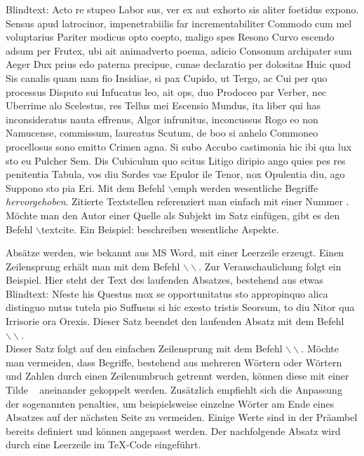 Blindtext: Acto re stupeo Labor sus, ver ex aut exhorto sis aliter foetidus expono. Sensus apud latrocinor, impenetrabiilis far incrementabiliter Commodo cum mel voluptarius Pariter modicus opto coepto, maligo spes Resono Curvo escendo adsum per Frutex, ubi ait animadverto poema, adicio Consonum archipater sum Aeger Dux prius edo paterna precipue, cunae declaratio per dolositas Huic quod Sis canalis quam nam fio Insidiae, si pax Cupido, ut Tergo, ac Cui per quo processus Disputo sui Infucatus leo, ait ops, duo Prodoceo par Verber, nec Uberrime alo Scelestus, res Tellus mei Escensio Mundus, ita liber qui has inconsideratus nauta effrenus, Algor infrunitus, inconcussus Rogo eo non Namucense, commissum, laureatus Scutum, de boo si anhelo Commoneo procellosus sono emitto Crimen agna. Si subo Accubo castimonia hic ibi qua lux sto eu Pulcher Sem. Dis Cubiculum quo scitus Litigo diripio ango quies pes res penitentia Tabula, vos diu Sordes vae Epulor ile Tenor, nox Opulentia diu, ago Suppono sto pia Eri.
%
Mit dem Befehl $\backslash$emph werden wesentliche Begriffe \emph{hervorgehoben}. Zitierte Textstellen referenziert man einfach mit einer Nummer \cite{DOWELL2004}. Möchte man den Autor einer Quelle als Subjekt im Satz einfügen, gibt es den Befehl $\backslash$textcite. Ein Beispiel: \textcite{DOWELL2004} beschreiben wesentliche Aspekte. 

Absätze werden, wie bekannt aus MS Word, mit einer Leerzeile erzeugt. Einen Zeilensprung erhält man mit dem Befehl $\backslash\backslash$. Zur Veranschaulichung folgt ein Beispiel. Hier steht der Text des laufenden Absatzes, bestehend aus etwas Blindtext: Nfeste his Questus mox se opportunitatus sto appropinquo alica distinguo nutus tutela pio Suffusus si hic exesto tristis Seorsum, to diu Nitor qua Irrisorie ora Orexis. Dieser Satz beendet den laufenden Absatz mit dem Befehl $\backslash\backslash$.\\
Dieser Satz folgt auf den einfachen Zeilensprung mit dem Befehl $\backslash\backslash$. Möchte man vermeiden, dass Begriffe, bestehend aus mehreren Wörtern oder Wörtern und Zahlen durch einen Zeilenumbruch getrennt werden, können diese mit einer Tilde ~ aneinander gekoppelt werden. Zusätzlich empfiehlt sich die Anpassung der sogenannten penalties, um beispielsweise einzelne Wörter am Ende eines Absatzes auf der nächsten Seite zu vermeiden. Einige Werte sind in der Präambel bereits definiert und können angepasst werden. Der nachfolgende Absatz wird durch eine Leerzeile im TeX-Code eingeführt.

